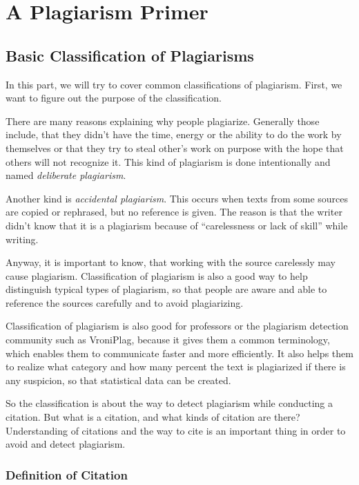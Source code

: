 ﻿\chapter{A Plagiarism Primer}\label{chap:plagOverview}

\section{Basic Classification of Plagiarisms}

In this part, we will try to cover common classifications of plagiarism. First, we want to figure out the purpose of 
the classification. 

There are many reasons explaining why people plagiarize. Generally those include, that they didn't have the time,
energy or the ability to do the work by themselves or that they try to steal other’s work on purpose with the hope that others
will not recognize it. This kind of plagiarism is done intentionally and named \textit{deliberate 
plagiarism}\citep{UEfAP}.

Another kind is \textit{accidental plagiarism}. This occurs when texts from some sources are copied or rephrased, but no 
reference is given. The reason is that the writer didn't know that it is a plagiarism because of \enquote{carelessness or  
lack of skill}\citep{UEfAP} while writing.

Anyway, it is important to know, that working with the source carelessly may cause plagiarism. Classification 
of plagiarism is also a good way to help distinguish typical types of plagiarism, so that people are aware and able 
to reference the sources carefully and to avoid plagiarizing.

Classification of plagiarism is also good for professors or the plagiarism detection community such as VroniPlag, because
it gives them a common terminology, which enables them to communicate faster and more efficiently. 
It also helps them to realize what category and how many percent the text is plagiarized 
if there is any suspicion, so that statistical data can be created.

So the classification is about the way to detect plagiarism while conducting a citation. But what is a citation, and 
what kinds of citation are there? Understanding of citations and the way to cite is an important thing in order to 
avoid and detect plagiarism.

\subsection{Definition of Citation}

